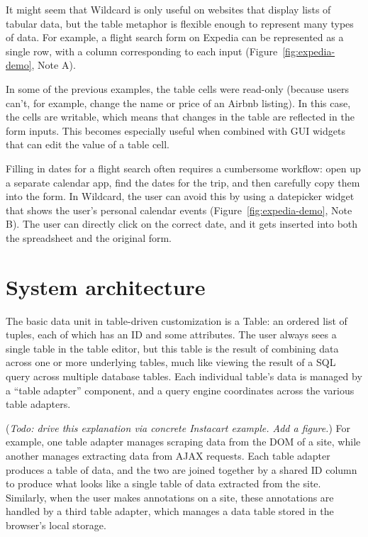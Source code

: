\documentclass[sigplan,10pt,anonymous,review]{acmart}
\begin{document}
It might seem that Wildcard is only useful on websites that display
lists of tabular data, but the table metaphor is flexible enough to
represent many types of data. For example, a flight search form on
Expedia can be represented as a single row, with a column corresponding
to each input{ (Figure~\ref{fig:expedia-demo}, Note A)}.

In some of the previous examples, the table cells were read-only
(because users can't, for example, change the name or price of an Airbnb
listing). In this case, the cells are writable, which means that changes
in the table are reflected in the form inputs. This becomes especially
useful when combined with GUI widgets that can edit the value of a table
cell.

Filling in dates for a flight search often requires a cumbersome
workflow: open up a separate calendar app, find the dates for the trip,
and then carefully copy them into the form. In Wildcard, the user can
avoid this by using a datepicker widget that shows the user's personal
calendar events{ (Figure~\ref{fig:expedia-demo}, Note B)}. The user can
directly click on the correct date, and it gets inserted into both the
spreadsheet and the original form.

\hypertarget{sec:architecture}{%
\section{System architecture}\label{sec:architecture}}

The basic data unit in table-driven customization is a Table: an ordered
list of tuples, each of which has an ID and some attributes. The user
always sees a single table in the table editor, but this table is the
result of combining data across one or more underlying tables, much like
viewing the result of a SQL query across multiple database tables. Each
individual table's data is managed by a ``table adapter'' component, and
a query engine coordinates across the various table adapters.

(\emph{Todo: drive this explanation via concrete Instacart example. Add
a figure.}) For example, one table adapter manages scraping data from
the DOM of a site, while another manages extracting data from AJAX
requests. Each table adapter produces a table of data, and the two are
joined together by a shared ID column to produce what looks like a
single table of data extracted from the site. Similarly, when the user
makes annotations on a site, these annotations are handled by a third
table adapter, which manages a data table stored in the browser's local
storage.
\end{document}
